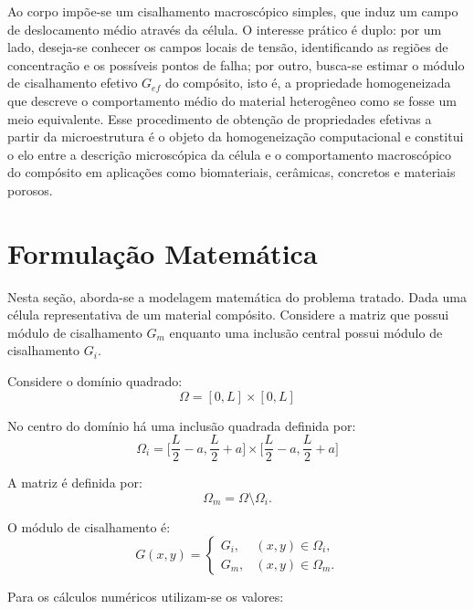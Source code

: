 \documentclass[brazil]{TCAM} %
\begin{document}
Ao corpo impõe-se um cisalhamento macroscópico simples, que induz um campo de deslocamento médio através da célula. O interesse prático é duplo: por um lado, deseja-se conhecer os campos locais de tensão, identificando as regiões de concentração e os possíveis pontos de falha; por outro, busca-se estimar o módulo de cisalhamento efetivo $G_{ef}$ do compósito, isto é, a propriedade homogeneizada que descreve o comportamento médio do material heterogêneo como se fosse um meio equivalente. Esse procedimento de obtenção de propriedades efetivas a partir da microestrutura é o objeto da homogeneização computacional \cite{geers2010multiscale,torquato2002random,moulinec1998numerical} e constitui o elo entre a descrição microscópica da célula e o comportamento macroscópico do compósito em aplicações como biomateriais, cerâmicas, concretos e materiais porosos.


\section{Formulação Matemática}
Nesta seção, aborda-se a modelagem matemática do problema tratado.
Dada uma célula representativa de um material compósito. Considere a matriz que possui módulo de cisalhamento $G_m$ enquanto uma inclusão central possui módulo de cisalhamento $G_i$.

Considere o domínio quadrado:
\begin{equation*}
    \Omega = [0,L] \times [0,L]
\end{equation*}

No centro do domínio há uma inclusão quadrada definida por:
\begin{equation*}
    \Omega_i = \Big[\dfrac{L}{2}-a, \dfrac{L}{2}+a\Big] \times \Big[\dfrac{L}{2}-a, \dfrac{L}{2}+a\Big]
\end{equation*}

A matriz é definida por:
\begin{equation*}
    \Omega_m = \Omega \setminus \Omega_i.
\end{equation*}

O módulo de cisalhamento é:
\begin{equation*}
    G(x,y)=
\begin{cases}
G_i, & (x,y)\in\Omega_i,\\[2mm]
G_m, & (x,y)\in\Omega_m.
\end{cases}
\end{equation*}

Para os cálculos numéricos utilizam-se os valores:
\end{document}
